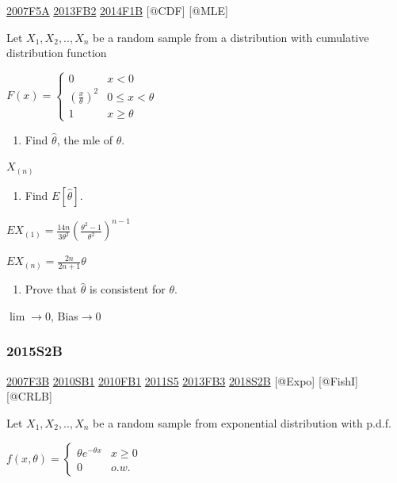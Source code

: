 \documentclass[6pt,Portrait]{article}
\providecommand{\tightlist}{%
  \setlength{\itemsep}{0pt}\setlength{\parskip}{0pt}}
\begin{document}
\protect\hyperlink{f5a}{2007F5A} \protect\hyperlink{fb2-2}{2013FB2}
\protect\hyperlink{f1b-1}{2014F1B} {[}@CDF{]} {[}@MLE{]}

Let \(X_1,X_2,..,X_n\) be a random sample from a distribution with
cumulative distribution function

\(F(x)=\begin{cases}0&x<0\\(\frac{x}\theta)^2& 0\le x<\theta\\1& x\ge\theta\end{cases}\)

\begin{enumerate}
\def\labelenumi{(\alph{enumi})}
\tightlist
\item
  Find \(\hat\theta\), the mle of \(\theta\).
\end{enumerate}

\(X_{(n)}\)

\begin{enumerate}
\def\labelenumi{(\alph{enumi})}
\setcounter{enumi}{1}
\tightlist
\item
  Find \(E[\hat\theta]\).
\end{enumerate}

\(EX_{(1)}=\frac{14n}{3\theta^2}(\frac{\theta^2-1}{\theta^2})^{n-1}\)

\(EX_{(n)}=\frac{2n}{2n+1}\theta\)

\begin{enumerate}
\def\labelenumi{(\alph{enumi})}
\setcounter{enumi}{2}
\tightlist
\item
  Prove that \(\hat\theta\) is consistent for \(\theta\).
\end{enumerate}

\(\lim\to0\), Bias\(\to0\)

\hypertarget{s2b-1}{%
\subsubsection{2015S2B}\label{s2b-1}}

\protect\hyperlink{f3b}{2007F3B} \protect\hyperlink{sb1-1}{2010SB1}
\protect\hyperlink{fb1-1}{2010FB1} \protect\hyperlink{s5-2}{2011S5}
\protect\hyperlink{fb3-2}{2013FB3} \protect\hyperlink{s2b-2}{2018S2B}
{[}@Expo{]} {[}@FishI{]} {[}@CRLB{]}

Let \(X_1,X_2,..,X_n\) be a random sample from exponential distribution
with p.d.f.

\(f(x,\theta)=\begin{cases}\theta e^{-\theta x}& x\ge0\\0& o.w.\end{cases}\)
\end{document}

